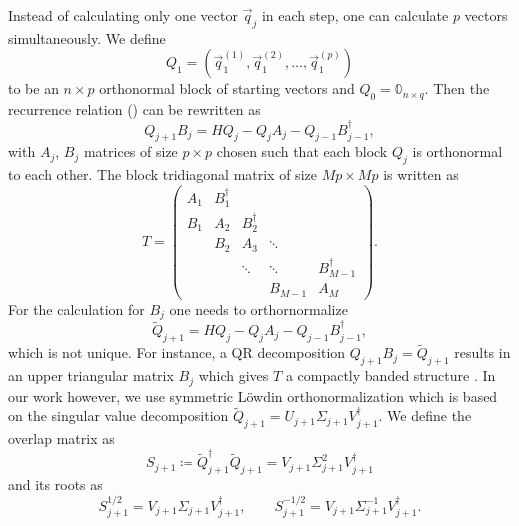 Instead of calculating only one vector $\vec{q}_j$ in each step,
one can calculate $p$ vectors simultaneously.
We define
\begin{equation}
    Q_1 = (\vec{q}_1^{(1)}, \vec{q}_1^{(2)}, \ldots, \vec{q}_1^{(p)})
\end{equation}
to be an $n\times p$ orthonormal block of starting vectors
and $Q_0 = \mathbb{0}_{n\times q}$.
Then the recurrence relation () can be rewritten as
\begin{equation}
    Q_{j+1} B_j = H Q_j - Q_j A_j - Q_{j-1} B_{j-1}^\dag,
    \label{eq:block-Lanczos-recurrence}
\end{equation}
with $A_j$, $B_j$ matrices of size $p\times p$ chosen such that each block $Q_j$ is orthonormal
to each other.
The block tridiagonal matrix of size $Mp\times Mp$ is written as
\begin{equation}
    T
    =
    \begin{pmatrix}
        A_1 & B_1^\dag &          &         &              \\
        B_1 & A_2      & B_2^\dag &         &              \\
            & B_2      & A_3      & \ddots  &              \\
            &          & \ddots   & \ddots  & B_{M-1}^\dag \\
            &          &          & B_{M-1} & A_M
    \end{pmatrix}.
    \label{eq:tridiagonal-block}
\end{equation}
For the calculation for $B_j$ one needs to orthornormalize
\begin{equation}
    \tilde Q_{j+1} = H Q_j - Q_j A_j - Q_{j-1} B_{j-1}^\dag,
\end{equation}
which is not unique.
For instance, a QR decomposition $Q_{j+1} B_j = \tilde Q_{j+1}$
results in an upper triangular matrix $B_j$ which gives $T$ a compactly banded structure
\cite{Cullum1985, Golub2013}.
In our work however, we use symmetric Löwdin orthonormalization \cite{Lowdin1950, Brass2021}
which is based on the singular value decomposition
$\tilde Q_{j+1} = U_{j+1} \Sigma_{j+1} V_{j+1}^\dag$.
We define the overlap matrix as
\begin{equation}
    S_{j+1} \coloneqq \tilde Q_{j+1}^\dag \tilde Q_{j+1} = V_{j+1} \Sigma_{j+1}^2 V_{j+1}^\dagger
\end{equation}
and its roots as
\begin{equation}
    S_{j+1}^{1/2}  = V_{j+1} \Sigma_{j+1} V_{j+1}^\dagger,
    \qquad
    S_{j+1}^{-1/2} = V_{j+1} \Sigma_{j+1}^{-1} V_{j+1}^\dagger.
\end{equation}
